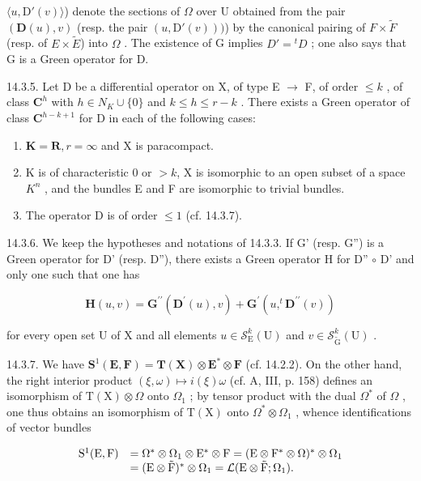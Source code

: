 \(\langle u, \mathrm{D}'(v) \rangle\)) denote the sections of \(\Omega\) over U obtained from the pair \((\mathbf{D}(u), v)\) (resp. the pair \((u, \mathrm{D}'(v)))\)) by the canonical pairing of \(F \times \tilde{F}\) (resp. of \(E \times \tilde{E}\)) into \(\Omega\) . The existence of G implies \(D' = {}^t D\) ; one also says that G is a Green operator for D.

14.3.5. Let D be a differential operator on X, of type E \(\to\) F, of order \(\leqslant k\) , of class \(\mathbf{C}^{h}\) with \(h \in N_{K} \cup \{0\}\) and \(k \leqslant h \leqslant r-k\) . There exists a Green operator of class \(\mathbf{C}^{h-k+1}\) for D in each of the following cases:

\begin{enumerate}
\def\labelenumi{\alph{enumi})}
\item
  \(\mathbf{K} = \mathbf{R}, r = \infty\) and X is paracompact.
\item
  K is of characteristic 0 or \(>k\), X is isomorphic to an open subset of a space \(K^{n}\) , and the bundles E and F are isomorphic to trivial bundles.
\item
  The operator D is of order \(\leqslant1\) (cf. 14.3.7).
\end{enumerate}

14.3.6. We keep the hypotheses and notations of 14.3.3. If G' (resp. G'') is a Green operator for D' (resp. D''), there exists a Green operator H for D'' \(\circ\) D' and only one such that one has

\[
\mathbf {H} (u, v) = \mathbf {G} ^ {\prime \prime} (\mathbf {D} ^ {\prime} (u), v) + \mathbf {G} ^ {\prime} (u, ^ {t} \mathbf {D} ^ {\prime \prime} (v))
\]

for every open set U of X and all elements \(u \in \mathcal{S}_{\mathrm{E}}^{k}(\mathrm{U})\) and \(v \in \mathcal{S}_{\widetilde{\mathrm{G}}}^{k}(\mathrm{U})\) .

14.3.7. We have \(\mathbf{S}^1 (\mathbf{E},\mathbf{F}) = \mathbf{T}(\mathbf{X})\otimes \mathbf{E}^*\otimes \mathbf{F}\) (cf. 14.2.2). On the other hand, the right interior product \((\xi ,\omega)\mapsto i(\xi)\omega\) (cf. A, III, p. 158) defines an isomorphism of \(\mathrm{T(X)}\otimes \Omega\) onto \(\Omega_{1}\) ; by tensor product with the dual \(\Omega^{*}\) of \(\Omega\) , one thus obtains an isomorphism of \(\mathrm{T(X)}\) onto \(\Omega^{*}\otimes \Omega_{1}\) , whence identifications of vector bundles

\[
\begin{array}{r l} \mathrm{S} ^ {1} (\mathrm{E}, \mathrm{F}) & = \Omega^ {*} \otimes \Omega_ {1} \otimes \mathrm{E} ^ {*} \otimes \mathrm{F} = (\mathrm{E} \otimes \mathrm{F} ^ {*} \otimes \Omega) ^ {*} \otimes \Omega_ {1} \\ & = (\mathrm{E} \otimes \tilde {\mathrm{F}}) ^ {*} \otimes \Omega_ {1} = \mathcal {L} (\mathrm{E} \otimes \tilde {\mathrm{F}}; \Omega_ {1}). \end{array}
\]

